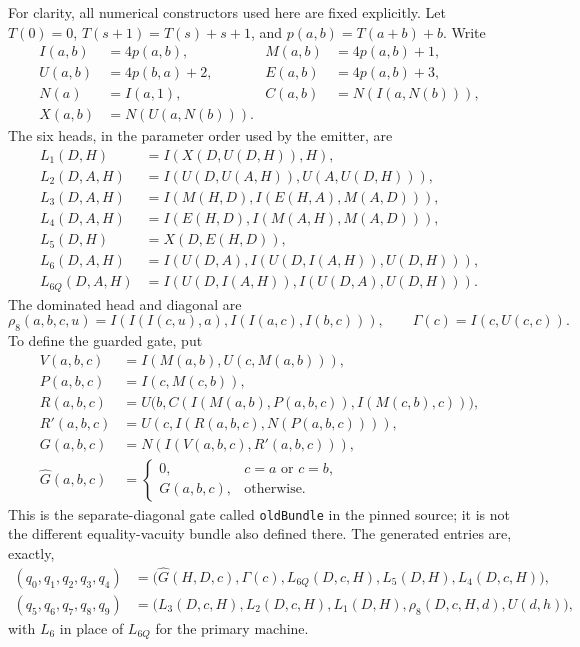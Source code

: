 For clarity, all numerical constructors used here are fixed explicitly.
Let $T(0)=0$, $T(s+1)=T(s)+s+1$, and $p(a,b)=T(a+b)+b$.
Write
\begin{align*}
 I(a,b)&=4p(a,b),& M(a,b)&=4p(a,b)+1,\\
 U(a,b)&=4p(b,a)+2,& E(a,b)&=4p(a,b)+3,\\
 N(a)&=I(a,1),& C(a,b)&=N(I(a,N(b))),\\
 X(a,b)&=N(U(a,N(b))).
\end{align*}
The six heads, in the parameter order used by the emitter, are
\begin{align*}
 L_1(D,H)&=I(X(D,U(D,H)),H),\\
 L_2(D,A,H)&=I(U(D,U(A,H)),U(A,U(D,H))),\\
 L_3(D,A,H)&=I(M(H,D),I(E(H,A),M(A,D))),\\
 L_4(D,A,H)&=I(E(H,D),I(M(A,H),M(A,D))),\\
 L_5(D,H)&=X(D,E(H,D)),\\
 L_6(D,A,H)&=I(U(D,A),I(U(D,I(A,H)),U(D,H))),\\
 L_{6Q}(D,A,H)&=I(U(D,I(A,H)),I(U(D,A),U(D,H))).
\end{align*}
The dominated head and diagonal are
\[
 \rho_8(a,b,c,u)=I(I(I(c,u),a),I(I(a,c),I(b,c))),
 \qquad \Gamma(c)=I(c,U(c,c)).
\]
To define the guarded gate, put
\begin{align*}
 V(a,b,c)&=I(M(a,b),U(c,M(a,b))),\\
 P(a,b,c)&=I(c,M(c,b)),\\
 R(a,b,c)&=U\bigl(b,C(I(M(a,b),P(a,b,c)),I(M(c,b),c))\bigr),\\
 R'(a,b,c)&=U(c,I(R(a,b,c),N(P(a,b,c)))),\\
 G(a,b,c)&=N(I(V(a,b,c),R'(a,b,c))),\\
 \widehat G(a,b,c)&=
   \begin{cases}0,&c=a\text{ or }c=b,\\G(a,b,c),&\text{otherwise.}\end{cases}
\end{align*}
This is the separate-diagonal gate called \texttt{oldBundle} in the
pinned source; it is not the different equality-vacuity bundle also
defined there.  The generated entries are, exactly,
\begin{align*}
 (q_0,q_1,q_2,q_3,q_4)
   &=\bigl(\widehat G(H,D,c),\Gamma(c),L_{6Q}(D,c,H),L_5(D,H),L_4(D,c,H)\bigr),\\
 (q_5,q_6,q_7,q_8,q_9)
   &=\bigl(L_3(D,c,H),L_2(D,c,H),L_1(D,H),\rho_8(D,c,H,d),U(d,h)\bigr),
\end{align*}
with $L_6$ in place of $L_{6Q}$ for the primary machine.

